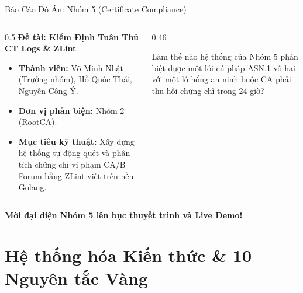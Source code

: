 \begin{frame}{Báo Cáo Đồ Án: Nhóm 5 (Certificate Compliance)}
  \begin{columns}[T]
    \begin{column}{0.5\textwidth}
      \textbf{Đề tài: Kiểm Định Tuân Thủ CT Logs \& ZLint}
      \begin{itemize}\small
        \item \textbf{Thành viên:} Võ Minh Nhật (Trưởng nhóm), Hồ Quốc Thái, Nguyễn Công Ý.
        \item \textbf{Đơn vị phản biện:} Nhóm 2 (RootCA).
        \item \textbf{Mục tiêu kỹ thuật:} Xây dựng hệ thống tự động quét và phân tích chứng chỉ vi phạm CA/B Forum bằng ZLint viết trên nền Golang.
      \end{itemize}
    \end{column}
    \begin{column}{0.46\textwidth}
      \begin{quizbox}
        Làm thế nào hệ thống của Nhóm 5 phân biệt được một lỗi cú pháp ASN.1 vô hại với một lỗ hổng an ninh buộc CA phải thu hồi chứng chỉ trong 24 giờ?
      \end{quizbox}
    \end{column}
  \end{columns}

  \vspace{0.6em}
  \centering\large\sffamily\bfseries\color{hcmutblue}
  Mời đại diện Nhóm 5 lên bục thuyết trình và Live Demo!
\end{frame}

\section{Hệ thống hóa Kiến thức \& 10 Nguyên tắc Vàng}

